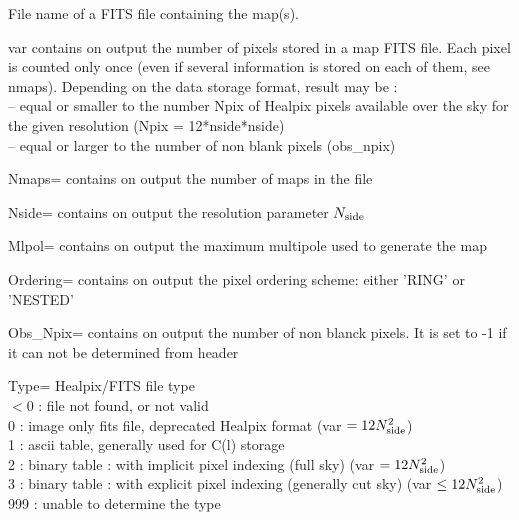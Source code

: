 \begin{qualifiers}
  \begin{qulistwide}{} %
 	\item[{File}] 
          name of a FITS file containing the \healpix map(s).

	\item[{var}] 
	 {contains on output the number of pixels stored in a map FITS file.
     Each pixel is counted only once 
     (even if several information is stored on each of them, see nmaps).
     Depending on the data storage format, result may be : \\
       -- equal or smaller to the number Npix of Healpix pixels available 
          over the sky for the given resolution (Npix =
     12*nside*nside) \\
       -- equal or larger to the number of non blank pixels 
         (obs\_npix)}

	
 	\item[{Nmaps=}]   contains on output the number of maps in the file
	

       \item[{Nside=}]   contains on output the \healpix resolution parameter $N_{\mathrm{side}}$
		  

       \item[{Mlpol=}]   contains on output the maximum multipole used to generate the map 

	\item[{Ordering=}]   contains on output the pixel ordering
	scheme: either 'RING' or 'NESTED'
		  
	\item[{Obs\_Npix=}]   contains on output the number of non blanck pixels. It is set to -1 if it can not be determined from header
		
	\item[{Type=}]  {Healpix/FITS file type\\
             $<$0 : file not found, or not valid\\
             0  : image only fits file, deprecated Healpix format
                   (var $=12N_{\mathrm{side}}^2$) \\
             1  : ascii table, generally used for C(l) storage \\
             2  : binary table : with implicit pixel indexing (full sky)
                   (var $=12N_{\mathrm{side}}^2$) \\
             3  : binary table : with explicit pixel indexing (generally cut sky)
                   (var $\le 12N_{\mathrm{side}}^2$) \\
           999  : unable to determine the type }


\end{qulistwide}
\end{qualifiers}
